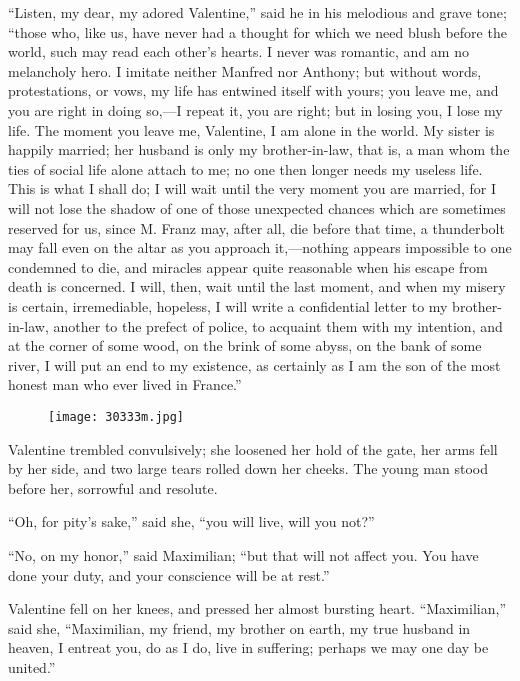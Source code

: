 “Listen, my dear, my adored Valentine,” said he in his melodious and
grave tone; “those who, like us, have never had a thought for which we
need blush before the world, such may read each other’s hearts. I never
was romantic, and am no melancholy hero. I imitate neither Manfred nor
Anthony; but without words, protestations, or vows, my life has
entwined itself with yours; you leave me, and you are right in doing
so,—I repeat it, you are right; but in losing you, I lose my life. The
moment you leave me, Valentine, I am alone in the world. My sister is
happily married; her husband is only my brother-in-law, that is, a man
whom the ties of social life alone attach to me; no one then longer
needs my useless life. This is what I shall do; I will wait until the
very moment you are married, for I will not lose the shadow of one of
those unexpected chances which are sometimes reserved for us, since M.
Franz may, after all, die before that time, a thunderbolt may fall even
on the altar as you approach it,—nothing appears impossible to one
condemned to die, and miracles appear quite reasonable when his escape
from death is concerned. I will, then, wait until the last moment, and
when my misery is certain, irremediable, hopeless, I will write a
confidential letter to my brother-in-law, another to the prefect of
police, to acquaint them with my intention, and at the corner of some
wood, on the brink of some abyss, on the bank of some river, I will put
an end to my existence, as certainly as I am the son of the most honest
man who ever lived in France.”

\begin{figure}[ht]
\texttt{[image: 30333m.jpg]}
\end{figure}

Valentine trembled convulsively; she loosened her hold of the gate, her
arms fell by her side, and two large tears rolled down her cheeks. The
young man stood before her, sorrowful and resolute.

“Oh, for pity’s sake,” said she, “you will live, will you not?”

“No, on my honor,” said Maximilian; “but that will not affect you. You
have done your duty, and your conscience will be at rest.”

Valentine fell on her knees, and pressed her almost bursting heart.
“Maximilian,” said she, “Maximilian, my friend, my brother on earth, my
true husband in heaven, I entreat you, do as I do, live in suffering;
perhaps we may one day be united.”

